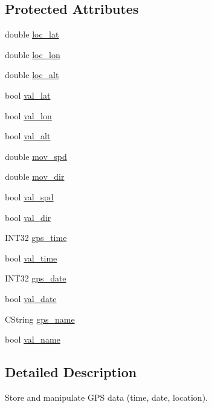 \subsection*{Protected Attributes}
\begin{DoxyCompactItemize}
\item 
double \hyperlink{classCGPSData_a06d07f0846f193d39382a68af36a285e}{loc\_\-lat}
\item 
double \hyperlink{classCGPSData_acf00f72540ec6345d2422f33a5fd0b1f}{loc\_\-lon}
\item 
double \hyperlink{classCGPSData_a6fdeb6174a04d86ee1f007d1db1b9002}{loc\_\-alt}
\item 
bool \hyperlink{classCGPSData_a36519c126bf507902e5d770ba8c95458}{val\_\-lat}
\item 
bool \hyperlink{classCGPSData_a49a67e538fa5945e0bfc736a443174bf}{val\_\-lon}
\item 
bool \hyperlink{classCGPSData_ac013f01207268ae1d22bb8a1fc77f424}{val\_\-alt}
\item 
double \hyperlink{classCGPSData_abbaf3f6b71e49e3aef87816449c28e48}{mov\_\-spd}
\item 
double \hyperlink{classCGPSData_a543d109aa9298d17278c9a7db58cdb4e}{mov\_\-dir}
\item 
bool \hyperlink{classCGPSData_a4cb88aa6709b11e2726ff08abf657601}{val\_\-spd}
\item 
bool \hyperlink{classCGPSData_aba46466e3a48ba5e69c1a8bedc7daa00}{val\_\-dir}
\item 
INT32 \hyperlink{classCGPSData_afb7905ff297607cc06e4846720ef6143}{gps\_\-time}
\item 
bool \hyperlink{classCGPSData_a5ef2d271e3356ee58b5dfdf9a0924a0a}{val\_\-time}
\item 
INT32 \hyperlink{classCGPSData_a20f13f73b2834db116560dc3067184b5}{gps\_\-date}
\item 
bool \hyperlink{classCGPSData_a00222a654d92f5ce8338b768ba6f42aa}{val\_\-date}
\item 
CString \hyperlink{classCGPSData_af1f3f6f7e4751c48e32a5e62d2d24224}{gps\_\-name}
\item 
bool \hyperlink{classCGPSData_ac5c339f86542189ba70f5284f256b6e1}{val\_\-name}
\end{DoxyCompactItemize}


\subsection{Detailed Description}
Store and manipulate GPS data (time, date, location). 

